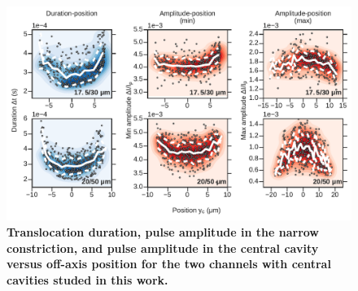 			\begin{figure}
				\includegraphics[width=\textwidth]{dtdIycavity.pdf}
				\caption{\textbf{Translocation duration, pulse amplitude in the narrow constriction, and pulse amplitude in the central cavity versus off-axis position for the two channels with central cavities studed in this work.}}
				\label{fig:dtdIycavity}
			\end{figure}

